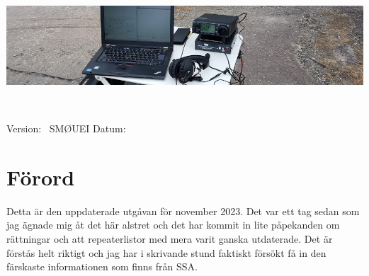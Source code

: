 
	
\pagestyle{empty}
\vfill
\vspace*{4cm}
\centerline{\includegraphics[width=\paperwidth]{logo/rubrikbild}}
\begin{flushright}
	\Huge{\bfseries{\TitleText}} \\[3mm]
	\Large{\bfseries{\SubtitleText}}
\end{flushright}

\vfill
	
Version: \DokVersion\ \hfill SMØUEI \hfill Datum: \DokumentDatum

\newpage


\pagestyle{fancy}
\lhead{\leftmark}

\chead{}


\cfoot{\scriptsize \thepage\ / \pageref{LastPage}}


\renewcommand{\footrulewidth}{0.2pt}



\cleardoublepage

\tableofcontents

\newpage

\setlength{\parskip}{0.5em}
\setlength{\parindent}{0pt}

\section*{Förord}
	
Detta är den uppdaterade utgåvan för november 2023. Det var ett tag
sedan som jag ägnade mig åt det här alstret och det har kommit in lite
påpekanden om rättningar och att repeaterlistor med mera varit ganska
utdaterade. Det är förstås helt riktigt och jag har i skrivande stund
faktiskt försökt få in den färskaste informationen som finns från SSA.

